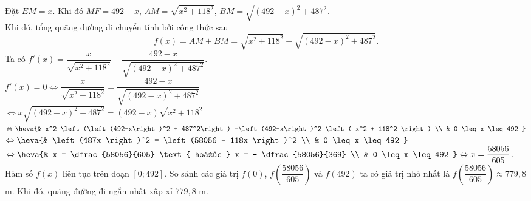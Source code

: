 \begin{ex}
{\begin{center}
\end{center}
Đặt $EM =x$. Khi đó $MF = 492 -x$, $AM = \sqrt{x^2 + 118^2}$, $BM = \sqrt{\left(492-x\right)^2 + 487^2}$. \\
Khi đó, tổng quãng đường di chuyển tính bởi công thức sau 
$$f(x) = AM + BM = \sqrt{x^2 + 118^2} + \sqrt{\left(492-x\right)^2 + 487^2}. $$
Ta có $f' (x) = \dfrac{x}{\sqrt{x^2 + 118^2}} - \dfrac{492 -x}{\sqrt{\left(492-x\right)^2 + 487^2}}$. \\
$f' (x) = 0 \Leftrightarrow \dfrac{x}{\sqrt{x^2 + 118^2}} = \dfrac{492 -x}{\sqrt{\left(492-x\right)^2 + 487^2}}$ \\ 
$\Leftrightarrow x \sqrt{\left(492-x\right)^2 + 487^2} = \left(492-x\right) \sqrt{x^2 + 118^2}$ \\
$\Leftrightarrow \heva{& x^2 \left(\left(492-x\right)^2 + 487^2\right) =\left(492-x\right)^2 \left( x^2 + 118^2 \right) \\ & 0 \leq x \leq 492 }$ \\ 
$\Leftrightarrow \heva{& \left(487x \right)^2 = \left(58056 - 118x \right)^2 \\ & 0 \leq x \leq 492 }$ \\ 
$\Leftrightarrow \heva{& x = \dfrac{58056}{605} \text{ hoặc } x = - \dfrac{58056}{369} \\ & 0 \leq x \leq 492 } \Leftrightarrow x = \dfrac{58056}{605}$. \\
Hàm số $f(x)$ liên tục trên đoạn $\left[0; 492 \right]$. So sánh các giá trị $f \left(0 \right)$, $f \left(\dfrac{58056}{605}\right)$ và $f \left(492 \right)$ ta có giá trị nhỏ nhất là $f \left(\dfrac{58056}{605}\right) \approx 779{,}8$ m. Khi đó, quãng đường đi ngắn nhất xấp xỉ $779{,}8$ m. 
}
\end{ex}

